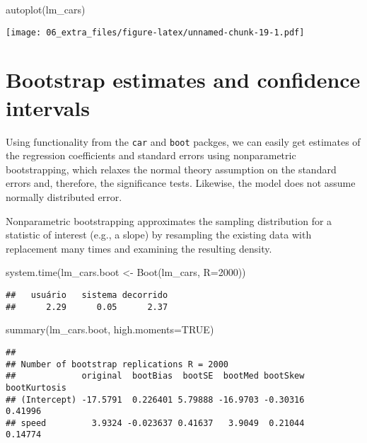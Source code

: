\documentclass[
]{book}
\newenvironment{Shaded}{\begin{snugshade}}{\end{snugshade}}
\newcommand{\AttributeTok}[1]{\textcolor[rgb]{0.77,0.63,0.00}{#1}}
\newcommand{\ConstantTok}[1]{\textcolor[rgb]{0.00,0.00,0.00}{#1}}
\newcommand{\DecValTok}[1]{\textcolor[rgb]{0.00,0.00,0.81}{#1}}
\newcommand{\FunctionTok}[1]{\textcolor[rgb]{0.00,0.00,0.00}{#1}}
\newcommand{\NormalTok}[1]{#1}
\newcommand{\OtherTok}[1]{\textcolor[rgb]{0.56,0.35,0.01}{#1}}
\begin{document}
\begin{Shaded}
\begin{Highlighting}[]
\FunctionTok{autoplot}\NormalTok{(lm\_cars)}
\end{Highlighting}
\end{Shaded}

\texttt{[image: 06\_extra\_files/figure-latex/unnamed-chunk-19-1.pdf]}

\hypertarget{bootstrap-estimates-and-confidence-intervals}{%
\section{Bootstrap estimates and confidence intervals}\label{bootstrap-estimates-and-confidence-intervals}}

Using functionality from the \texttt{car} and \texttt{boot} packges, we can easily get estimates of the regression coefficients and standard errors using nonparametric bootstrapping, which relaxes the normal theory assumption on the standard errors and, therefore, the significance tests. Likewise, the model does not assume normally distributed error.

Nonparametric bootstrapping approximates the sampling distribution for a statistic of interest (e.g., a slope) by resampling the existing data with replacement many times and examining the resulting density.

\begin{Shaded}
\begin{Highlighting}[]
\FunctionTok{system.time}\NormalTok{(lm\_cars.boot }\OtherTok{\textless{}{-}} \FunctionTok{Boot}\NormalTok{(lm\_cars, }\AttributeTok{R=}\DecValTok{2000}\NormalTok{))}
\end{Highlighting}
\end{Shaded}

\begin{verbatim}
##   usuário   sistema decorrido 
##      2.29      0.05      2.37
\end{verbatim}

\begin{Shaded}
\begin{Highlighting}[]
\FunctionTok{summary}\NormalTok{(lm\_cars.boot, }\AttributeTok{high.moments=}\ConstantTok{TRUE}\NormalTok{)}
\end{Highlighting}
\end{Shaded}

\begin{verbatim}
## 
## Number of bootstrap replications R = 2000 
##             original  bootBias  bootSE  bootMed bootSkew bootKurtosis
## (Intercept) -17.5791  0.226401 5.79888 -16.9703 -0.30316      0.41996
## speed         3.9324 -0.023637 0.41637   3.9049  0.21044      0.14774
\end{verbatim}
\end{document}
